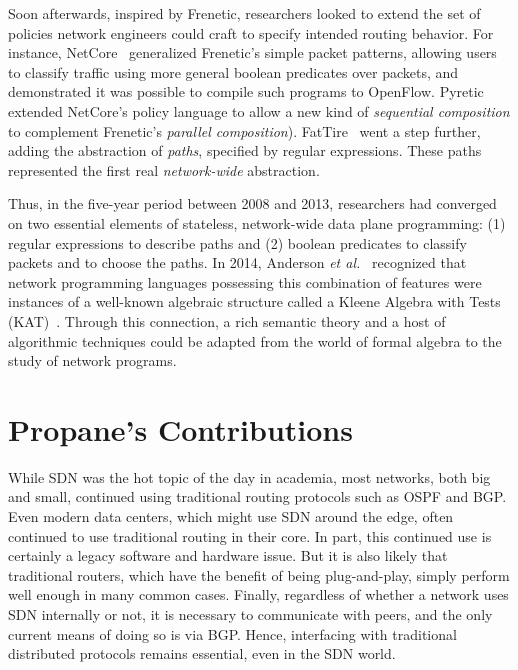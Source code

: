 \documentclass[sigconf]{acmart}
\begin{document}
Soon afterwards, inspired by Frenetic, researchers looked to extend the set of
policies network engineers could craft to specify intended routing
behavior.
For instance,
NetCore~\cite{netcore} generalized Frenetic's
simple packet patterns, allowing users to classify traffic
using more general boolean predicates over packets, and demonstrated
it was possible to compile
such programs to OpenFlow.
Pyretic~\cite{pyretic} extended NetCore's policy language to allow a
new kind of \emph{sequential composition} to complement Frenetic's
\emph{parallel composition}).  FatTire~\cite{fattire} went a step
further, adding the
abstraction of \emph{paths}, specified by regular expressions.
These paths represented the first real \emph{network-wide}
abstraction.

Thus, in the five-year period between 2008 and 2013,
researchers had converged on two essential elements of stateless,
network-wide data
plane programming:  (1) regular expressions to describe paths and (2)
boolean predicates to classify packets and to choose the paths.  In 2014, Anderson \emph{et al.}~\cite{netkat}
recognized that network programming languages possessing this
combination of features were instances of a well-known algebraic
structure called a Kleene Algebra with Tests
(KAT)~\cite{kat}.  Through this connection, a rich semantic
theory and a host of algorithmic techniques could be adapted from the
world of formal algebra to the study of network programs.

\section{Propane's Contributions}

While SDN was the hot topic of the day in academia,
most networks, both big and small, continued using
traditional routing protocols such as
OSPF and BGP.  Even modern data centers, which might use SDN around
the edge, often continued to use traditional routing in their
core.  In part, this continued use is certainly
a legacy software and hardware issue.  But it is also likely that
traditional routers, which have the benefit of being plug-and-play,
simply perform well enough in many common
cases.  Finally, regardless of whether a network uses SDN internally
or not, it is necessary to communicate with peers, and the only
current means of doing so is via BGP.  Hence, interfacing with
traditional distributed protocols remains essential, even in the SDN
world.
\end{document}
